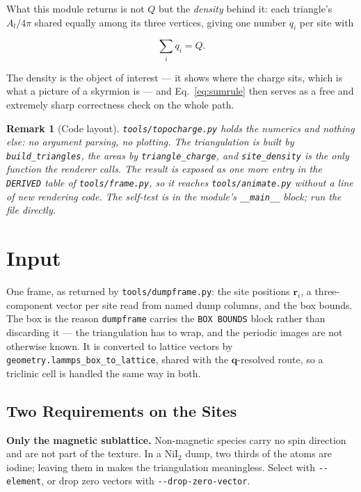 \documentclass[12pt, a4paper, oneside]{article}
\newtheorem{remark}[theorem]{Remark}
\newcommand{\rvec}{\mathbf{r}}
\begin{document}
What this module returns is not $Q$ but the \emph{density} behind it: each
triangle's $A_l/4\pi$ shared equally among its three vertices, giving one
number $q_i$ per site with

\begin{equation}
    \sum_i q_i = Q .
    \label{eq:sumrule}
\end{equation}

The density is the object of interest --- it shows where the charge sits, which
is what a picture of a skyrmion is --- and Eq.~\eqref{eq:sumrule} then serves
as a free and extremely sharp correctness check on the whole path.

\begin{remark}[Code layout]
\texttt{tools/topocharge.py} holds the numerics and nothing else: no argument
parsing, no plotting. The triangulation is built by \texttt{build\_triangles},
the areas by \texttt{triangle\_charge}, and \texttt{site\_density} is the only
function the renderer calls. The result is exposed as one more entry in the
\texttt{DERIVED} table of \texttt{tools/frame.py}, so it reaches
\texttt{tools/animate.py} without a line of new rendering code. The self-test
is in the module's \texttt{\_\_main\_\_} block; run the file directly.
\end{remark}

\section{Input}

One frame, as returned by \texttt{tools/dumpframe.py}: the site positions
$\rvec_i$, a three-component vector per site read from named dump columns, and
the box bounds. The box is the reason \texttt{dumpframe} carries the
\texttt{BOX BOUNDS} block rather than discarding it --- the triangulation has to
wrap, and the periodic images are not otherwise known. It is converted to
lattice vectors by \texttt{geometry.lammps\_box\_to\_lattice}, shared with the
$\mathbf{q}$-resolved route, so a triclinic cell is handled the same way in
both.

\subsection{Two Requirements on the Sites}

\textbf{Only the magnetic sublattice.} Non-magnetic species carry no spin
direction and are not part of the texture. In a NiI$_2$ dump, two thirds of the
atoms are iodine; leaving them in makes the triangulation meaningless. Select
with \texttt{-\/-element}, or drop zero vectors with
\texttt{-\/-drop-zero-vector}.
\end{document}
